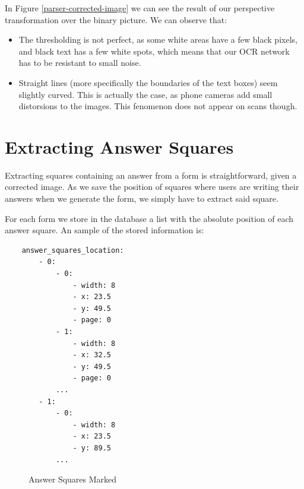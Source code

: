 \documentclass[12pt, a4paper]{report}
\begin{document}
In Figure \ref{parser-corrected-image} we can see the result of our perspective transformation over the binary picture. We can observe that:

\begin{itemize}
	\item The thresholding is not perfect, as some white areas have a few black pixels, and black text has a few white spots, which means that our OCR network has to be resistant to small noise.
	\item Straight lines (more specifically the boundaries of the text boxes) seem slightly curved. This is actually the case, as phone cameras add small distorsions to the images. This fenomenon does not appear on scans though.
\end{itemize}

\section{Extracting Answer Squares}

Extracting squares containing an answer from a form is straightforward, given a corrected image. As we save the position of squares where users are writing their answers when we generate the form, we simply have to extract said square.

For each form we store in the database a list with the absolute position of each answer square. An sample of the stored information is:

\begin{verbatim}
    answer_squares_location:
        - 0:
            - 0:
                - width: 8
                - x: 23.5
                - y: 49.5
                - page: 0
            - 1:
                - width: 8
                - x: 32.5
                - y: 49.5
                - page: 0
            ...
        - 1:
            - 0:
                - width: 8
                - x: 23.5
                - y: 89.5
            ...
\end{verbatim}

\begin{figure}[!h]
	\centering
	\caption{Answer Squares Marked}
	\label{answer-squares-red}
\end{figure}
\end{document}
